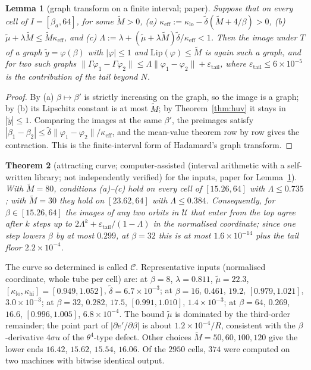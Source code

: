 \documentclass[11pt,a4paper]{article}
\newtheorem{theorem}{Theorem}[section]
\newtheorem{lemma}[theorem]{Lemma}
\theoremstyle{definition}
\theoremstyle{remark}
\newcommand{\cU}{\mathcal{U}}
\newcommand{\cC}{\mathcal{C}}
\newcommand{\IA}{computer-assisted (interval arithmetic with a self-written library; not independently verified)}
\begin{document}
\begin{lemma}[graph transform on a finite interval; paper]\label{lem:graph}
Suppose that on every cell of $I=[\beta_a,64]$, for some $\tilde M>0$,
(a) $\kappa_{\mathrm{eff}}:=\kappa_{\mathrm{lo}}-\tilde\delta(\tilde M+4/\beta)>0$,
(b) $\tilde\mu+\lambda\tilde M\le\tilde M\kappa_{\mathrm{eff}}$, and
(c) $\Lambda:=\lambda+(\tilde\mu+\lambda\tilde M)\tilde\delta/\kappa_{\mathrm{eff}}<1$.
Then the image under $T$ of a graph $\tilde y=\varphi(\beta)$ with $|\varphi|\le1$ and $\mathrm{Lip}(\varphi)\le\tilde M$ is again such a graph, and for two such graphs $\|\Gamma\varphi_1-\Gamma\varphi_2\|\le\Lambda\|\varphi_1-\varphi_2\|+\varepsilon_{\mathrm{tail}}$, where $\varepsilon_{\mathrm{tail}}\le6\times10^{-5}$ is the contribution of the tail beyond $N$.
\end{lemma}
\begin{proof}
By (a) $\beta\mapsto\beta'$ is strictly increasing on the graph, so the image is a graph; by (b) its Lipschitz constant is at most $\tilde M$; by Theorem~\ref{thm:huv} it stays in $|\tilde y|\le1$.
Comparing the images at the same $\beta'$, the preimages satisfy $|\beta_1-\beta_2|\le\tilde\delta\|\varphi_1-\varphi_2\|/\kappa_{\mathrm{eff}}$, and the mean-value theorem row by row gives the contraction.
This is the finite-interval form of Hadamard's graph transform.
\end{proof}

\begin{theorem}[attracting curve; \IA{} for the inputs, paper for Lemma~\ref{lem:graph}]\label{thm:curve}
With $\tilde M=80$, conditions (a)--(c) hold on every cell of $[15.26,64]$ with $\Lambda\le0.735$; with $\tilde M=30$ they hold on $[23.62,64]$ with $\Lambda\le0.384$.
Consequently, for $\beta\in[15.26,64]$ the images of any two orbits in $\cU$ that enter from the top agree after $k$ steps up to $2\Lambda^k+\varepsilon_{\mathrm{tail}}/(1-\Lambda)$ in the normalised coordinate; since one step lowers $\beta$ by at most $0.299$, at $\beta=32$ this is at most $1.6\times10^{-14}$ plus the tail floor $2.2\times10^{-4}$.
\end{theorem}
The curve so determined is called $\cC$.
Representative inputs (normalised coordinate, whole tube per cell) are: at $\beta=8$, $\lambda=0.811$, $\tilde\mu=22.3$, $[\kappa_{\mathrm{lo}},\kappa_{\mathrm{hi}}]=[0.949,1.052]$, $\tilde\delta=6.7\times10^{-3}$; at $\beta=16$, $0.461$, $19.2$, $[0.979,1.021]$, $3.0\times10^{-3}$; at $\beta=32$, $0.282$, $17.5$, $[0.991,1.010]$, $1.4\times10^{-3}$; at $\beta=64$, $0.269$, $16.6$, $[0.996,1.005]$, $6.8\times10^{-4}$.
The bound $\tilde\mu$ is dominated by the third-order remainder; the point part of $|\partial e'/\partial\beta|$ is about $1.2\times10^{-4}/R$, consistent with the $\beta$-derivative $4\sigma u$ of the $\theta^4$-type defect.
Other choices $\tilde M=50,60,100,120$ give the lower ends $16.42$, $15.62$, $15.54$, $16.06$.
Of the $2950$ cells, $374$ were computed on two machines with bitwise identical output.
\end{document}
